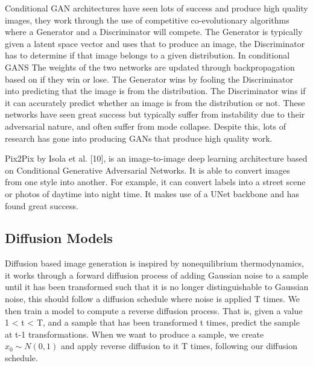 \documentclass{UoYCSproject}
\begin{document}


Conditional GAN architectures have seen lots of success and produce high quality images, they work through the use of competitive co-evolutionary algorithms where a Generator and a Discriminator will compete. The Generator is typically given a latent space vector and uses that to produce an image, the Discriminator has to determine if that image belongs to a given distribution. In conditional GANS The weights of the two networks are updated through backpropagation based on if they win or lose. The Generator wins by fooling the Discriminator into predicting that the image is from the distribution. The Discriminator wins if it can accurately predict whether an image is from the distribution or not. These networks have seen great success but typically suffer from instability due to their adversarial nature, and often suffer from mode collapse. Despite this, lots of research has gone into producing GANs that produce high quality work.  

Pix2Pix by Isola et al. [10], is an image-to-image deep learning architecture based on Conditional Generative Adversarial Networks. It is able to convert images from one style into another. For example, it can convert labels into a street scene or photos of daytime into night time. It makes use of a UNet backbone and has found great success. 
\subsection{Diffusion Models}


Diffusion based image generation is inspired by nonequilibrium thermodynamics, it works through a forward diffusion process of adding Gaussian noise to a sample until it has been transformed such that it is no longer distinguishable to Gaussian noise, this should follow a diffusion schedule where noise is applied T times. We then train a model to compute a reverse diffusion process. That is, given a value 1 < t < T, and a sample that has been transformed t times, predict the sample at t-1 transformations. When we want to produce a sample, we create $ x_0 \sim N(0,1) $ and apply reverse diffusion to it T times, following our diffusion schedule. 
\end{document}
